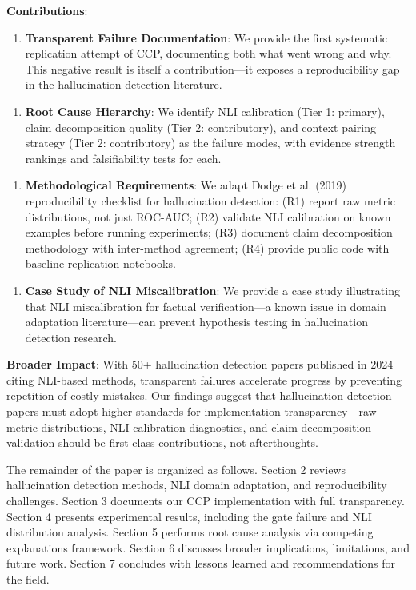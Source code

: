 \textbf{Contributions}:

\begin{enumerate}
\item \textbf{Transparent Failure Documentation}: We provide the first systematic replication attempt of CCP, documenting both what went wrong and why. This negative result is itself a contribution---it exposes a reproducibility gap in the hallucination detection literature.
\end{enumerate}

\begin{enumerate}
\item \textbf{Root Cause Hierarchy}: We identify NLI calibration (Tier 1: primary), claim decomposition quality (Tier 2: contributory), and context pairing strategy (Tier 2: contributory) as the failure modes, with evidence strength rankings and falsifiability tests for each.
\end{enumerate}

\begin{enumerate}
\item \textbf{Methodological Requirements}: We adapt Dodge et al. (2019) reproducibility checklist for hallucination detection: (R1) report raw metric distributions, not just ROC-AUC; (R2) validate NLI calibration on known examples before running experiments; (R3) document claim decomposition methodology with inter-method agreement; (R4) provide public code with baseline replication notebooks.
\end{enumerate}

\begin{enumerate}
\item \textbf{Case Study of NLI Miscalibration}: We provide a case study illustrating that NLI miscalibration for factual verification---a known issue in domain adaptation literature---can prevent hypothesis testing in hallucination detection research.
\end{enumerate}

\textbf{Broader Impact}: With 50+ hallucination detection papers published in 2024 citing NLI-based methods, transparent failures accelerate progress by preventing repetition of costly mistakes. Our findings suggest that hallucination detection papers must adopt higher standards for implementation transparency---raw metric distributions, NLI calibration diagnostics, and claim decomposition validation should be first-class contributions, not afterthoughts.

The remainder of the paper is organized as follows. Section 2 reviews hallucination detection methods, NLI domain adaptation, and reproducibility challenges. Section 3 documents our CCP implementation with full transparency. Section 4 presents experimental results, including the gate failure and NLI distribution analysis. Section 5 performs root cause analysis via competing explanations framework. Section 6 discusses broader implications, limitations, and future work. Section 7 concludes with lessons learned and recommendations for the field.
